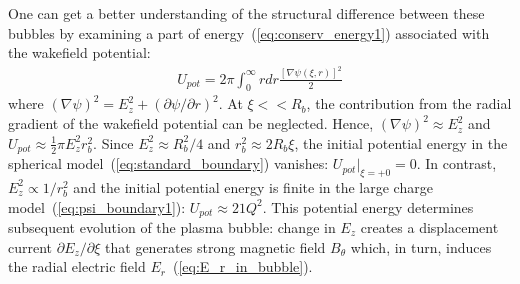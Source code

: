 \documentclass[twocolumn,showpacs,aip]{revtex4}
\begin{document}
One can get a better understanding of the structural  difference between these bubbles by examining a part of   energy~(\ref{eq:conserv_energy1})  associated with the wakefield potential: 
\begin{eqnarray}
U_{pot}=2\pi \int_{0}^{\infty}rdr\frac{[\nabla\psi(\xi,r)]^2}{2}
\label{eq:U_tot}
\end{eqnarray}
where  $(\nabla\psi)^2=E_z^2+(\partial\psi/\partial r)^2$.  At  $\xi<<R_b$, the contribution from the radial gradient of the wakefield potential can be neglected. Hence, $(\nabla\psi)^2\approx E_z^2$ and  $U_{pot}\approx \frac{1}{2}\pi E_z^2 r_b^2$.
Since $E_z^2\approx R_b^2/4$  and $r_b^2\approx 2R_b\xi$, the initial potential energy in the spherical model~(\ref{eq:standard_boundary}) vanishes: $U_{pot}|_{\xi=+0}=0$.  In contrast,   $E_z^2\propto 1/r_b^2$ and   
the initial potential energy   is finite in the large charge model~(\ref{eq:psi_boundary1}): $U_{pot}\approx 21 Q^2$. This potential energy %
determines subsequent evolution of the plasma bubble: change in $E_z$ creates a displacement current $\partial E_z/\partial \xi$ that generates strong magnetic field $B_{\theta}$ which, in turn, induces the radial electric field $E_r$~(\ref{eq:E_r_in_bubble}). 
 




\end{document}
